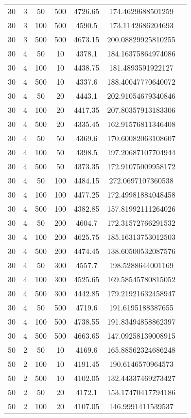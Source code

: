 {\begin{longtabu}{S
S
S
S
S
S[round-mode=places,round-precision=0]
S[round-mode=places,round-precision=0]}
30 & 3 & 50 & 500 & 4726.65 & 174.4629688501259 \\
30 & 3 & 100 & 500 & 4590.5 & 173.1142686204693 \\
30 & 3 & 500 & 500 & 4673.15 & 200.08829925810255 \\
30 & 4 & 50 & 10 & 4378.1 & 184.16375864974086 \\
30 & 4 & 100 & 10 & 4438.75 & 181.4893591922127 \\
30 & 4 & 500 & 10 & 4337.6 & 188.40047770640072 \\
30 & 4 & 50 & 20 & 4443.1 & 202.91054679340846 \\
30 & 4 & 100 & 20 & 4417.35 & 207.80357913183306 \\
30 & 4 & 500 & 20 & 4335.45 & 162.91576811346408 \\
30 & 4 & 50 & 50 & 4369.6 & 170.60082063108607 \\
30 & 4 & 100 & 50 & 4398.5 & 197.20687107704944 \\
30 & 4 & 500 & 50 & 4373.35 & 172.91075009958172 \\
30 & 4 & 50 & 100 & 4484.15 & 272.0697107360538 \\
30 & 4 & 100 & 100 & 4477.25 & 172.49981884048458 \\
30 & 4 & 500 & 100 & 4382.85 & 157.81992111264026 \\
30 & 4 & 50 & 200 & 4604.7 & 172.31572766291532 \\
30 & 4 & 100 & 200 & 4625.75 & 185.16313753012503 \\
30 & 4 & 500 & 200 & 4474.45 & 138.60500532087576 \\
30 & 4 & 50 & 300 & 4557.7 & 198.5288644001169 \\
30 & 4 & 100 & 300 & 4525.65 & 169.58545780815052 \\
30 & 4 & 500 & 300 & 4442.85 & 179.21921632458947 \\
30 & 4 & 50 & 500 & 4719.6 & 191.6195188387655 \\
30 & 4 & 100 & 500 & 4738.55 & 191.83494858862397 \\
30 & 4 & 500 & 500 & 4663.65 & 147.09258139008915 \\
50 & 2 & 50 & 10 & 4169.6 & 165.88562324686248 \\
50 & 2 & 100 & 10 & 4191.45 & 190.6146570964573 \\
50 & 2 & 500 & 10 & 4102.05 & 132.44337469273427 \\
50 & 2 & 50 & 20 & 4172.1 & 153.17470417794186 \\
50 & 2 & 100 & 20 & 4107.05 & 146.9991411539537 \\

\end{longtabu}}
